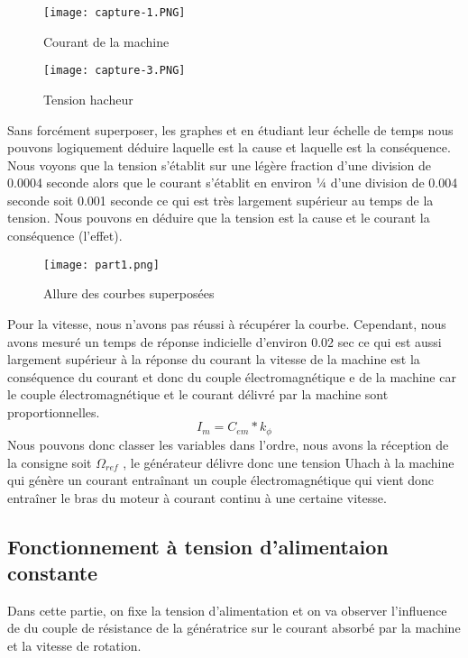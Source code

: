 \documentclass[oneside,a4paper,12pt]{article}
\begin{document}
		\begin{figure}[h]
			\centering
			\texttt{[image: capture-1.PNG]}
			\caption{Courant de la machine}
		\end{figure}
		\begin{figure}[h]
			\centering
			\texttt{[image: capture-3.PNG]}
			\caption{Tension hacheur}
		\end{figure}
	
		\newpage
		
		Sans forcément superposer, les graphes et en étudiant leur échelle de temps nous pouvons logiquement déduire laquelle est la cause et laquelle est la conséquence. Nous voyons que la tension s’établit sur une légère fraction d’une division de 0.0004 seconde alors que le courant s’établit en environ 1⁄4 d'une division de 0.004 seconde soit 0.001 seconde ce qui est très largement supérieur au temps de la tension. Nous pouvons en déduire  que la tension est la cause et le courant la conséquence (l’effet).
		
		\begin{figure}[h]
			\centering
			\texttt{[image: part1.png]}
			\caption{Allure des courbes superposées}
		\end{figure}
		
		Pour la vitesse, nous n’avons pas réussi à récupérer la courbe. Cependant, nous avons mesuré un temps de réponse indicielle d’environ 0.02 sec ce qui est aussi largement supérieur à la réponse du courant la vitesse de la machine est la conséquence du courant et donc du couple électromagnétique e de la machine car le couple électromagnétique et le courant délivré par la machine sont proportionnelles.
		$$ I_{m}=C_{em}*k_{\phi} $$
		Nous pouvons donc classer les variables dans l’ordre, nous avons la réception de la consigne soit $\Omega_{ref}$ , le générateur délivre donc une tension Uhach à la machine qui génère un courant entraînant un couple électromagnétique qui vient donc entraîner le bras du moteur à courant continu à une certaine vitesse.
		
		
	\newpage
	\subsection{Fonctionnement à tension d'alimentaion constante}
	
		Dans cette partie, on fixe la tension d'alimentation et on va observer l'influence de du couple de résistance de la génératrice sur le courant absorbé par la machine et la vitesse de rotation.
		
\end{document}
